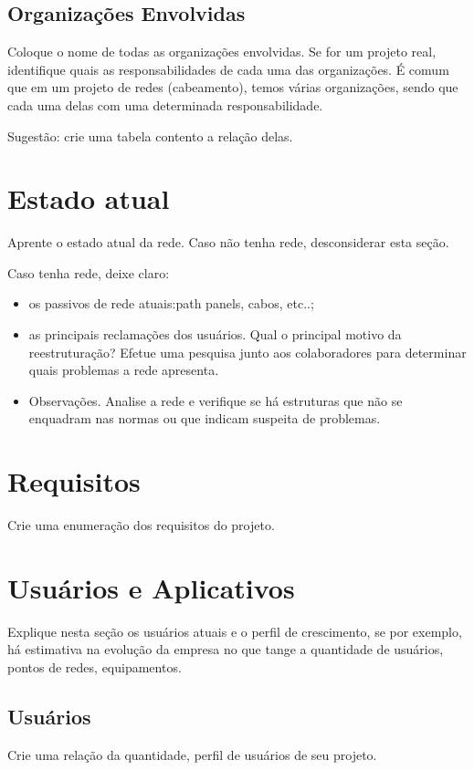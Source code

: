 \documentclass[	DIV=calc,%
							paper=a4,%
							fontsize=12pt,%
							onecolumn]{scrartcl}	 					%
\begin{document}
\subsection{Organizações Envolvidas}
Coloque o nome de todas as organizações envolvidas. Se for um projeto real, identifique quais as responsabilidades de cada uma das organizações. É comum que em um projeto de redes (cabeamento), temos várias organizações, sendo que cada uma delas com uma determinada responsabilidade.

Sugestão: crie uma tabela contento a relação delas.



\section{Estado atual}
Aprente o estado atual da rede. Caso não tenha rede, desconsiderar esta seção.

Caso tenha rede, deixe claro:
\begin{itemize}
	\item os passivos de rede atuais:path panels, cabos, etc..;
	\item as principais reclamações dos usuários. Qual o principal motivo da reestruturação? Efetue uma pesquisa junto aos colaboradores para determinar quais problemas a rede apresenta.
	\item Observações. Analise a rede e verifique se há estruturas que não se enquadram nas normas ou que indicam suspeita de problemas.
\end{itemize}

\section{Requisitos}
Crie uma enumeração dos requisitos do projeto.

\section{Usuários e Aplicativos}
Explique nesta seção os usuários atuais e o perfil de crescimento, se por exemplo, há estimativa na evolução da empresa no que tange a quantidade de usuários, pontos de redes, equipamentos.
 

\subsection{Usuários}
Crie uma relação da quantidade, perfil de usuários de seu projeto.
\end{document}
